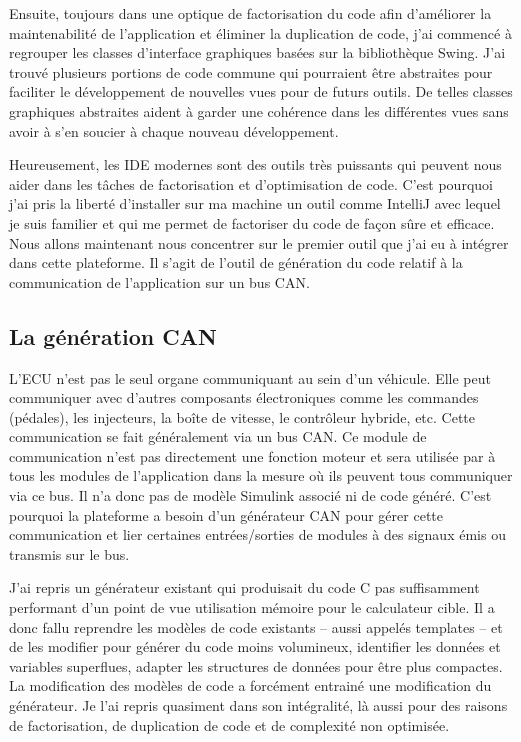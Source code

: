 Ensuite, toujours dans une optique de factorisation du code afin d'améliorer la
maintenabilité de l'application et éliminer la duplication de code, j'ai
commencé à regrouper les classes d'interface graphiques basées sur la
bibliothèque Swing. J'ai trouvé plusieurs portions de code commune qui
pourraient être abstraites pour faciliter le développement de nouvelles vues
pour de futurs outils. De telles classes graphiques abstraites aident à garder une
cohérence dans les différentes vues sans avoir à s'en soucier à chaque nouveau
développement.

Heureusement, les IDE modernes sont des outils très puissants qui peuvent nous
aider dans les tâches de factorisation et d'optimisation de code. C'est pourquoi
j'ai pris la liberté d'installer sur ma machine un outil comme IntelliJ avec
lequel je suis familier et qui me permet de factoriser du code de façon sûre et
efficace.\\

Nous allons maintenant nous concentrer sur le premier outil que j'ai eu à
intégrer dans cette plateforme. Il s'agit de l'outil de génération du code
relatif à la communication de l'application sur un bus CAN.

\subsection{La génération CAN}
L'ECU n'est pas le seul organe communiquant au sein d'un véhicule. Elle peut
communiquer avec d'autres composants électroniques comme les commandes
(pédales), les injecteurs, la boîte de vitesse, le contrôleur hybride, etc.
Cette communication se fait généralement via un bus CAN. Ce module de
communication n'est pas directement une fonction moteur et sera \og utilisée \fg{}
par à tous les modules de l'application dans la mesure où ils peuvent tous
communiquer via ce bus. Il n'a donc pas de modèle Simulink\up{\circledR} associé
ni de code généré. C'est pourquoi la plateforme a besoin d'un générateur CAN
pour gérer cette communication et lier certaines entrées/sorties de modules à des
signaux émis ou transmis sur le bus.

J'ai repris un générateur existant qui produisait du code C pas
suffisamment performant d'un point de vue utilisation mémoire pour le
calculateur cible. Il a donc fallu reprendre les modèles de code existants --
aussi appelés \og templates \fg{} -- et de les modifier pour générer du code
moins volumineux, identifier les données et variables superflues, adapter les
structures de données pour être plus compactes. La modification des modèles de
code a forcément entrainé une modification du générateur. Je l'ai repris
quasiment dans son intégralité, là aussi pour des raisons de factorisation, de
duplication de code et de complexité non optimisée.

